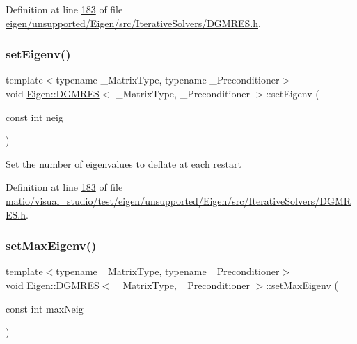 Definition at line \hyperlink{eigen_2unsupported_2_eigen_2src_2_iterative_solvers_2_d_g_m_r_e_s_8h_source_l00183}{183} of file \hyperlink{eigen_2unsupported_2_eigen_2src_2_iterative_solvers_2_d_g_m_r_e_s_8h_source}{eigen/unsupported/\+Eigen/src/\+Iterative\+Solvers/\+D\+G\+M\+R\+E\+S.\+h}.

\mbox{\label{class_eigen_1_1_d_g_m_r_e_s_a7510f3ded5959a8d98c3cd3aabebc84b}} 
\subsubsection{\texorpdfstring{set\+Eigenv()}{setEigenv()}\hspace{0.1cm}{\footnotesize\ttfamily [2/2]}}
{\footnotesize\ttfamily template$<$typename \+\_\+\+Matrix\+Type, typename \+\_\+\+Preconditioner$>$ \\
void \hyperlink{class_eigen_1_1_d_g_m_r_e_s}{Eigen\+::\+D\+G\+M\+R\+ES}$<$ \+\_\+\+Matrix\+Type, \+\_\+\+Preconditioner $>$\+::set\+Eigenv (\begin{DoxyParamCaption}\item[{const int}]{neig }\end{DoxyParamCaption})\hspace{0.3cm}{\ttfamily [inline]}}

Set the number of eigenvalues to deflate at each restart 

Definition at line \hyperlink{matio_2visual__studio_2test_2eigen_2unsupported_2_eigen_2src_2_iterative_solvers_2_d_g_m_r_e_s_8h_source_l00183}{183} of file \hyperlink{matio_2visual__studio_2test_2eigen_2unsupported_2_eigen_2src_2_iterative_solvers_2_d_g_m_r_e_s_8h_source}{matio/visual\+\_\+studio/test/eigen/unsupported/\+Eigen/src/\+Iterative\+Solvers/\+D\+G\+M\+R\+E\+S.\+h}.

\mbox{\label{class_eigen_1_1_d_g_m_r_e_s_ada9f5fbba382ae941f207322a8b84a01}} 
\subsubsection{\texorpdfstring{set\+Max\+Eigenv()}{setMaxEigenv()}\hspace{0.1cm}{\footnotesize\ttfamily [1/2]}}
{\footnotesize\ttfamily template$<$typename \+\_\+\+Matrix\+Type, typename \+\_\+\+Preconditioner$>$ \\
void \hyperlink{class_eigen_1_1_d_g_m_r_e_s}{Eigen\+::\+D\+G\+M\+R\+ES}$<$ \+\_\+\+Matrix\+Type, \+\_\+\+Preconditioner $>$\+::set\+Max\+Eigenv (\begin{DoxyParamCaption}\item[{const int}]{max\+Neig }\end{DoxyParamCaption})\hspace{0.3cm}{\ttfamily [inline]}}


